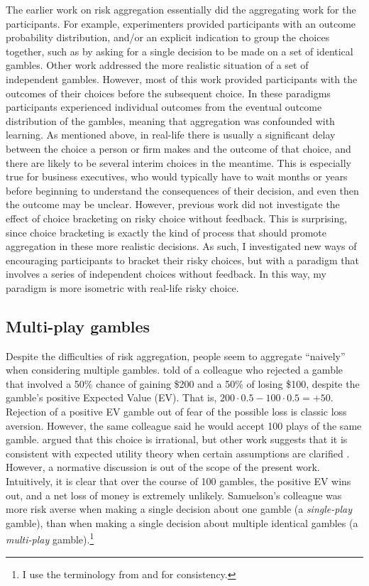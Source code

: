 \documentclass[a4paper, nobind, dvipsnames]{templates/ociamthesis}
\theoremstyle{definition}
\theoremstyle{definition}
\theoremstyle{definition}
\theoremstyle{definition}
\theoremstyle{remark}
\begin{document}
The earlier work on risk aggregation essentially did the aggregating work for
the participants. For example, experimenters provided participants with an
outcome probability distribution, and/or an explicit indication to group the
choices together, such as by asking for a single decision to be made on a set of
identical gambles. Other work addressed the more realistic situation of a set of
independent gambles. However, most of this work provided participants with the
outcomes of their choices before the subsequent choice. In these paradigms
participants experienced individual outcomes from the eventual outcome
distribution of the gambles, meaning that aggregation was confounded with
learning. As mentioned above, in real-life there is usually a significant delay
between the choice a person or firm makes and the outcome of that choice, and
there are likely to be several interim choices in the meantime. This is
especially true for business executives, who would typically have to wait months
or years before beginning to understand the consequences of their decision, and
even then the outcome may be unclear. However, previous work did not investigate
the effect of choice bracketing on risky choice without feedback. This is
surprising, since choice bracketing is exactly the kind of process that should
promote aggregation in these more realistic decisions. As such, I investigated
new ways of encouraging participants to bracket their risky choices, but with a
paradigm that involves a series of independent choices without feedback. In this
way, my paradigm is more isometric with real-life risky choice.

\hypertarget{multi-play-gambles}{%
\subsection{Multi-play gambles}\label{multi-play-gambles}}

Despite the difficulties of risk aggregation, people seem to aggregate ``naively''
when considering multiple gambles. \textcite{samuelson1963} told of a colleague who
rejected a gamble that involved a 50\% chance of gaining \$200 and a 50\% of losing
\$100, despite the gamble's positive Expected Value (EV). That is, \(200 \cdot 0.5 - 100 \cdot 0.5 = +50\). Rejection of a positive EV gamble out of fear of the
possible loss is classic loss aversion. However, the same colleague said he
would accept 100 plays of the same gamble. \textcite{samuelson1963} argued that this
choice is irrational, but other work suggests that it is consistent with
expected utility theory when certain assumptions are clarified \autocites[e.g.,][]{ross1999,aloysius2007}. However, a normative discussion is out of the scope of the
present work. Intuitively, it is clear that over the course of 100 gambles, the
positive EV wins out, and a net loss of money is extremely unlikely. Samuelson's
colleague was more risk averse when making a single decision about one gamble (a
\emph{single-play} gamble), than when making a single decision about multiple
identical gambles (a \emph{multi-play} gamble).\footnote{I use the terminology from \textcite{bristow2011} and \textcite{camilleri2013} for
  consistency.}
\end{document}
